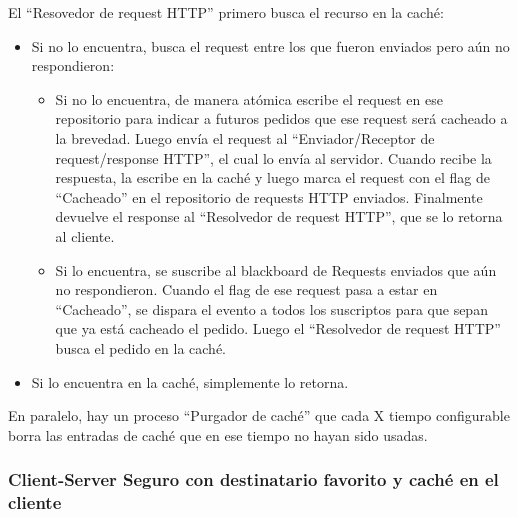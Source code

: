 El ``Resovedor de request HTTP'' primero busca el recurso en la caché:
\begin{itemize}
	\item Si no lo encuentra, busca el request entre los que fueron enviados pero aún no respondieron:
	\begin{itemize}
		\item Si no lo encuentra, de manera atómica escribe el request en ese repositorio para indicar a futuros
        pedidos que ese request será cacheado a la brevedad. Luego envía el request al ``Enviador/Receptor de
        request/response HTTP'', el cual lo envía al servidor. Cuando recibe la respuesta, la escribe en la caché
        y luego marca el request con el flag de ``Cacheado'' en el repositorio de requests HTTP enviados. Finalmente
        devuelve el response al ``Resolvedor de request HTTP'', que se lo retorna al cliente.
        
        \item Si lo encuentra, se suscribe al blackboard de Requests enviados que aún no respondieron.
        Cuando el flag de ese request pasa a estar en ``Cacheado'', se dispara el evento
        a todos los suscriptos para que sepan que ya está cacheado el pedido. Luego el ``Resolvedor de
        request HTTP'' busca el pedido en la caché.
	\end{itemize}
	
	\item  Si lo encuentra en la caché, simplemente lo retorna.
\end{itemize}

En paralelo, hay un proceso ``Purgador de caché'' que cada X tiempo configurable borra las entradas
de caché que en ese tiempo no hayan sido usadas.


\subsubsection{Client-Server Seguro con destinatario favorito y caché en el cliente}


